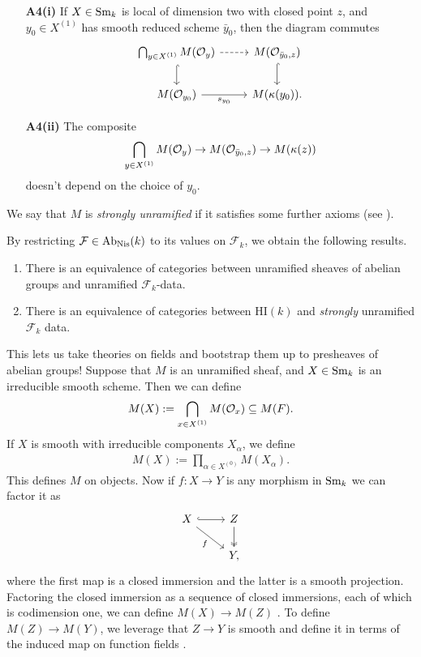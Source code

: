 \documentclass[11pt,openany]{book}
\providecommand{\HI}{\mathrm{HI}}
\begin{document}
\begin{definition}
\begin{enumerate}
    \item[\textbf{A4(i)}] If $X\in \mathrm{Sm}_k$ is local of dimension two with closed point $z$, and $y_0 \in X^{(1)}$ has smooth reduced scheme $\bar{y}_0$, then the diagram commutes
\[ \begin{tikzcd}
    \bigcap_{y\in X^{(1)}} M(\O_y)\dar[hook]\rar[dashed] & M(\O_{\bar{y}_0,z})\dar[hook]\\
    M(\O_{y_0})\rar["s_{y_0}" below] & M(\kappa(y_0)).
\end{tikzcd} \]

    \item[\textbf{A4(ii)}] The composite
    \begin{align*}
        \bigcap_{y\in X^{(1)}}M(\mathcal{O}_y) \to M(\mathcal{O}_{\bar{y}_0,z}) \to M(\kappa(z))
    \end{align*}
    doesn't depend on the choice of $y_0$.
\end{enumerate}
We say that $M$ is \textit{strongly unramified} if it satisfies some further axioms (see \cite[\S2]{Morel}).
\end{definition}

\begin{theorem}\label{thm:restriction-to-Fk}
\cite[2.27]{Morel} By restricting $\mathcal{F}\in \mathrm{Ab}_{\mathrm{Nis}}(k)$ to its values on $\mathcal{F}_k$, we obtain the following results.
\begin{enumerate}
    \item There is an equivalence of categories between unramified sheaves of abelian groups and unramified $\mathcal{F}_k$-data.
    \item There is an equivalence of categories between $\HI(k)$ and \textit{strongly} unramified $\mathcal{F}_k$ data.
\end{enumerate}
\end{theorem}

This lets us take theories on fields and bootstrap them up to presheaves of abelian groups! Suppose that $M$ is an unramified sheaf, and $X\in \mathrm{Sm}_k$ is an irreducible smooth scheme. Then we can define
\begin{align*}
    M(X) := \bigcap_{x\in X^{(1)}} M(\mathcal{O}_x) \subseteq M(F).
\end{align*}
If $X$ is smooth with irreducible components $X_\alpha$, we define
\begin{align*}
    M(X) := \prod_{\alpha\in X^{(0)}}M(X_\alpha).
\end{align*}
This defines $M$ on objects. Now if $f \colon X \to Y$ is any morphism in $\mathrm{Sm}_k$ we can factor it as
\[ \begin{tikzcd}
    X\rar[hook]\ar[dr,"f" below left] & Z\dar[two heads]\\
     & Y,
\end{tikzcd} \]
where the first map is a closed immersion and the latter is a smooth projection. Factoring the closed immersion as a sequence of closed immersions, each of which is codimension one, we can define $M(X) \to M(Z)$ \cite[2.13]{Morel}. To define $M(Z) \to M(Y)$, we leverage that $Z \to Y$ is smooth and define it in terms of the induced map on function fields \cite[p.~17]{Morel}.
\end{document}
